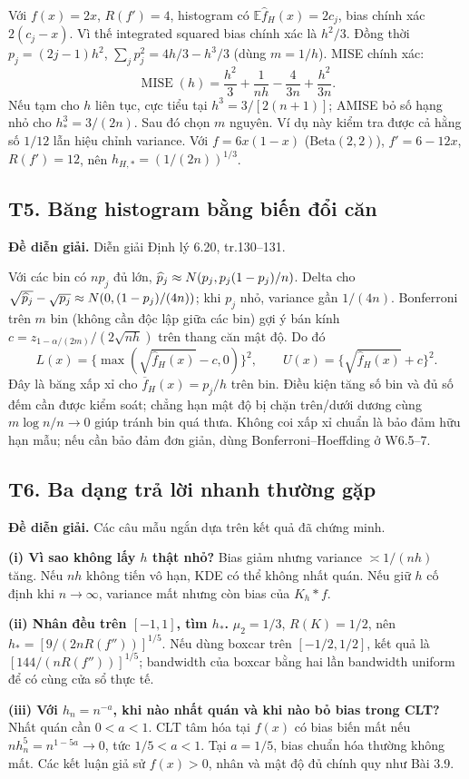 \documentclass[11pt,a4paper]{article}
\newcommand{\E}{\mathbb E}\newcommand{\Pp}{\mathbb P}
\DeclareMathOperator{\MISE}{MISE}\DeclareMathOperator{\AMISE}{AMISE}
\newcommand{\supp}[3]{\subsection{#1. #2}\label{s:#1}\textbf{Đề diễn giải.} #3\par}
\begin{document}
Với $f(x)=2x$, $R(f')=4$, histogram có $\E\widehat f_H(x)=2c_j$, bias chính xác $2(c_j-x)$. Vì thế integrated squared bias chính xác là $h^2/3$. Đồng thời
$p_j=(2j-1)h^2$, $\sum_jp_j^2=4h/3-h^3/3$ (dùng $m=1/h$). MISE chính xác:
\[
\MISE(h)=\frac{h^2}{3}+\frac1{nh}-\frac4{3n}+\frac{h^2}{3n}.
\]
Nếu tạm cho $h$ liên tục, cực tiểu tại $h^3=3/[2(n+1)]$; AMISE bỏ số hạng nhỏ cho $h_*^3=3/(2n)$. Sau đó chọn $m$ nguyên. Ví dụ này kiểm tra được cả hằng số $1/12$ lẫn hiệu chỉnh variance.
Với $f=6x(1-x)$ (Beta$(2,2)$), $f'=6-12x$, $R(f')=12$, nên $h_{H,*}=(1/(2n))^{1/3}$.

\supp{T5}{Băng histogram bằng biến đổi căn}{Diễn giải Định lý 6.20, tr.130--131.}
Với các bin có $np_j$ đủ lớn, $\widehat p_j\approx N(p_j,p_j(1-p_j)/n)$. Delta cho
$\sqrt{\widehat p_j}-\sqrt{p_j}\approx N(0,(1-p_j)/(4n))$; khi $p_j$ nhỏ, variance gần $1/(4n)$.
Bonferroni trên $m$ bin (không cần độc lập giữa các bin) gợi ý bán kính
$c=z_{1-\alpha/(2m)}/(2\sqrt{nh})$ trên thang căn mật độ. Do đó
\[
L(x)=\{\max(\sqrt{\widehat f_H(x)}-c,0)\}^2,\qquad
U(x)=\{\sqrt{\widehat f_H(x)}+c\}^2.
\]
Đây là băng xấp xỉ cho $\overline f_H(x)=p_j/h$ trên bin. Điều kiện tăng số bin và đủ số đếm cần được kiểm soát; chẳng hạn mật độ bị chặn trên/dưới dương cùng $m\log n/n\to0$ giúp tránh bin quá thưa. Không coi xấp xỉ chuẩn là bảo đảm hữu hạn mẫu; nếu cần bảo đảm đơn giản, dùng Bonferroni--Hoeffding ở W6.5--7.

\supp{T6}{Ba dạng trả lời nhanh thường gặp}{Các câu mẫu ngắn dựa trên kết quả đã chứng minh.}
\textbf{(i) Vì sao không lấy $h$ thật nhỏ?} Bias giảm nhưng variance $\asymp1/(nh)$ tăng. Nếu $nh$ không tiến vô hạn, KDE có thể không nhất quán. Nếu giữ $h$ cố định khi $n\to\infty$, variance mất nhưng còn bias của $K_h*f$.

\textbf{(ii) Nhân đều trên $[-1,1]$, tìm $h_*$.} $\mu_2=1/3$, $R(K)=1/2$, nên
$h_*=[9/(2nR(f''))]^{1/5}$. Nếu dùng boxcar trên $[-1/2,1/2]$, kết quả là $[144/(nR(f''))]^{1/5}$; bandwidth của boxcar bằng hai lần bandwidth uniform để có cùng cửa sổ thực tế.

\textbf{(iii) Với $h_n=n^{-a}$, khi nào nhất quán và khi nào bỏ bias trong CLT?} Nhất quán cần $0<a<1$. CLT tâm hóa tại $f(x)$ có bias biến mất nếu $nh_n^5=n^{1-5a}\to0$, tức $1/5<a<1$. Tại $a=1/5$, bias chuẩn hóa thường không mất. Các kết luận giả sử $f(x)>0$, nhân và mật độ đủ chính quy như Bài 3.9.
\end{document}
